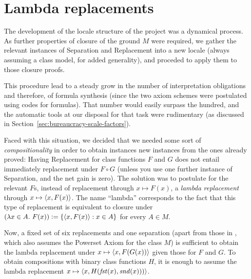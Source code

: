 \section{Lambda replacements}\label{sec:lambda-replacements}

The development of the locale structure of the project was a dynamical
process. As further properties of closure of the ground $M$ were
required, we gather the relevant instances of Separation and
Replacement into a new locale (always assuming a class model, for
added generality), and proceded to apply them to those closure proofs.

This procedure lead to a steady grow in the number of interpretation
obligations and therefore, of formula synthesis (since the two axiom
schemes were postulated using codes for formulas). That number would
easily surpass the hundred, and the automatic tools at our disposal
for that task were rudimentary (as discussed in
Section~\ref{sec:bureaucracy-scale-factors}).

Faced with this situation, we decided that we needed some sort of
\emph{compositionality} in order to obtain instances new instances
from the ones already proved: Having Replacement for class functions
$F$ and $G$ does not entail immediately replacement under $F\circ G$
(unless you use one further instance of Separation, and the net gain
is zero). The solution was to postulate for the relevant $F$s, instead
of replacement through $x\mapsto F(x)$, a \emph{lambda replacement}
through $x\mapsto \langle x,F(x)\rangle$. The name “lambda” corresponds to the
fact that this type of replacement is equivalent to closure under
$(\lambda x\in A.\ F(x)) \mathrel{\mathop:}= \{ \langle x,F(x)\rangle : x\in A \}$ for every
$A\in M$.

Now, a fixed set of six replacements and one separation (apart from
those in , which also assumes the Powerset
Axiom for the class $M$) is sufficient to obtain the lambda
replacement under $x\mapsto \langle x,F(G(x))\rangle$ given those for $F$ and
$G$. To obtain compositions with binary class functions $H$, it is
enough to assume the lambda replacement
$x\mapsto \langle x,H(\mathit{fst}(x),\mathit{snd}(x)))\rangle$.


